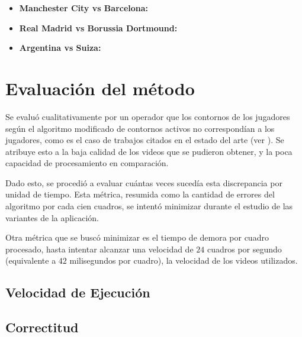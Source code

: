 \begin{itemize}
  \item \textbf{Manchester City vs Barcelona:}

  \item \textbf{Real Madrid vs Borussia Dortmound:}

  \item \textbf{Argentina vs Suiza:}

\end{itemize}

\section{Evaluación del método}

Se evaluó cualitativamente por un operador que los contornos de los jugadores
según el algoritmo modificado de contornos activos no correspondían a los
jugadores, como es el caso de trabajos citados en el estado del arte (ver
\cite{papers-tanos}). Se atribuye esto a la baja calidad de los videos que se
pudieron obtener, y la poca capacidad de procesamiento en comparación.

Dado esto, se procedió a evaluar cuántas veces sucedía esta discrepancia por
unidad de tiempo. Esta métrica, resumida como la cantidad de errores del
algoritmo por cada cien cuadros, se intentó minimizar durante el estudio de las
variantes de la aplicación.

Otra métrica que se buscó minimizar es el tiempo de demora por cuadro
procesado, hasta intentar alcanzar una velocidad de $24$ cuadros por segundo
(equivalente a $42$ milisegundos por cuadro), la velocidad de los videos
utilizados.

\subsection{Velocidad de Ejecución}

\subsection{Correctitud}


